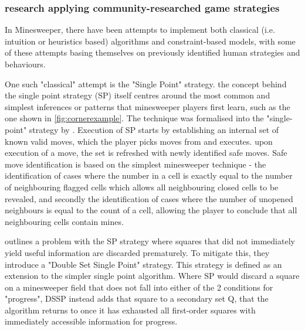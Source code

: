 
\subsubsection{research applying community-researched game strategies} \label{awa:basicHHuristicsIntoAlgorithms}
In Minesweeper, there have been attempts to implement both classical (i.e. intuition or heuristics based) algorithms and constraint-based models, with some of these attempts basing themselves on previously identified human strategies and behaviours.

One such "classical" attempt is the "Single Point" strategy. the concept behind the single point strategy (SP) itself centres around the most common and simplest inferences or patterns that minesweeper players first learn, such as the one shown in \cref{fig:cornerexample}. The technique was formalised into the "single-point" strategy by \citeauthor{minesweeperSinglePoint}. Execution of SP starts by establishing an internal set of known valid moves, which the player picks moves from and executes. upon execution of a move, the set is refreshed with newly identified safe moves. Safe move identification is based on the simplest minesweeper technique - the identification of cases where the number in a cell is exactly equal to the number of neighbouring flagged cells which allows all neighbouring closed cells to be revealed, and secondly the identification of cases where the number of unopened neighbours is equal to the count of a cell, allowing the player to conclude that all neighbouring cells contain mines.

\citeauthor{minesweeperSolverShowdown} outlines a problem with the SP strategy where squares that did not immediately yield useful information are discarded prematurely. To mitigate this, they introduce a "Double Set Single Point" strategy. This strategy is defined as an extension to the simpler single point algorithm. Where SP would discard a square on a minesweeper field that does not fall into either of the 2 conditions for "progress", DSSP instead adds that square to a secondary set Q, that the algorithm returns to once it has exhausted all first-order squares with immediately accessible information for progress.


